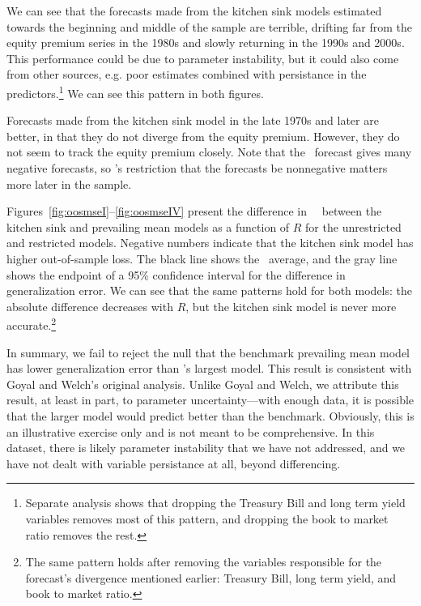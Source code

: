 \documentclass[11pt]{article}
\newcommand{\citepos}[1]{\citeauthor{#1}'s \citeyearpar{#1}}
\begin{document}
We can see that the forecasts made from the kitchen sink models
estimated towards the beginning and middle of the sample are terrible,
drifting far from the equity premium series in the 1980s and slowly
returning in the 1990s and 2000s.  This performance could be due to
parameter instability, but it could also come from other sources,
e.g. poor estimates combined with persistance in the
predictors.\footnote{Separate analysis shows that dropping the
  Treasury Bill and long term yield variables removes most of this
  pattern, and dropping the book to market ratio removes the rest.}
We can see this pattern in both figures.

Forecasts made from the kitchen sink model in the late 1970s and later
are better, in that they do not diverge from the equity premium.
However, they do not seem to track the equity premium closely.  Note
that the \ols\ forecast gives many negative forecasts, so
\citepos{campbell-thompson-2008-rfs} restriction that the forecasts be
nonnegative matters more later in the sample.

Figures~\ref{fig:oosmseI}--\ref{fig:oosmseIV} present the difference
in \oos\ \mse\ between the kitchen sink and prevailing mean models as
a function of $R$ for the unrestricted and restricted models.
Negative numbers indicate that the kitchen sink model has higher
out-of-sample loss.  The black line shows the \oos\ average, and the
gray line shows the endpoint of a 95\% confidence interval for the
difference in generalization error.  We can see that the same patterns
hold for both models: the absolute difference decreases with $R$, but
the kitchen sink model is never more accurate.\footnote{The same
  pattern holds after removing the variables responsible for the
  forecast's divergence mentioned earlier: Treasury Bill, long term
  yield, and book to market ratio.}

In summary, we fail to reject the null that the benchmark prevailing
mean model has lower generalization error than
\citepos{goyal-welch-2008-rfs} largest model.  This result is
consistent with Goyal and Welch's original analysis.  Unlike Goyal and
Welch, we attribute this result, at least in part, to parameter
uncertainty---with enough data, it is possible that the larger model
would predict better than the benchmark.  Obviously, this is an
illustrative exercise only and is not meant to be comprehensive.  In
this dataset, there is likely parameter instability that we have not
addressed, and we have not dealt with variable persistance at all,
beyond differencing.
\end{document}
